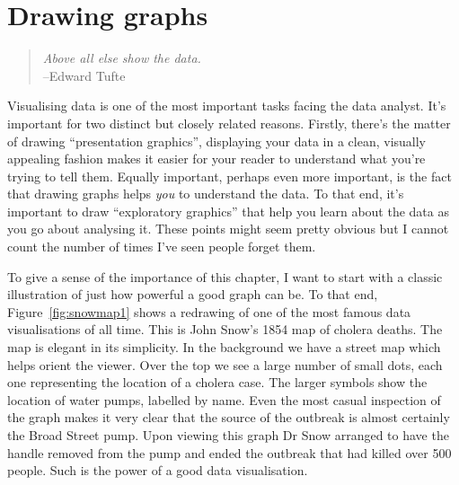 

\chapter{Drawing graphs\label{ch:graphics}}

\begin{quote}
{\it Above all else show the data.}\\
\hspace*{2cm} --Edward Tufte
\end{quote}

Visualising data is one of the most important tasks facing the data analyst. It's important for two distinct but closely related reasons. Firstly, there's the matter of drawing ``presentation graphics'', displaying your data in a clean, visually appealing fashion makes it easier for your reader to understand what you're trying to tell them. Equally important, perhaps even more important, is the fact that drawing graphs helps {\it you} to understand the data. To that end, it's important to draw ``exploratory graphics'' that help you learn about the data as you go about analysing it. These points might seem pretty obvious but I cannot count the number of times I've seen people forget them. 

To give a sense of the importance of this chapter, I want to start with a classic illustration of just how powerful a good graph can be. To that end, Figure~\ref{fig:snowmap1} shows a redrawing of one of the most famous data visualisations of all time. This is John Snow's 1854 map of cholera deaths. The map is elegant in its simplicity. In the background we have a street map which helps orient the viewer. Over the top we see a large number of small dots, each one representing the location of a cholera case. The larger symbols show the location of water pumps, labelled by name. Even the most casual inspection of the graph makes it very clear that the source of the outbreak is almost certainly the Broad Street pump. Upon viewing this graph Dr Snow arranged to have the handle removed from the pump and ended the outbreak that had killed over 500 people. Such is the power of a good data visualisation.

